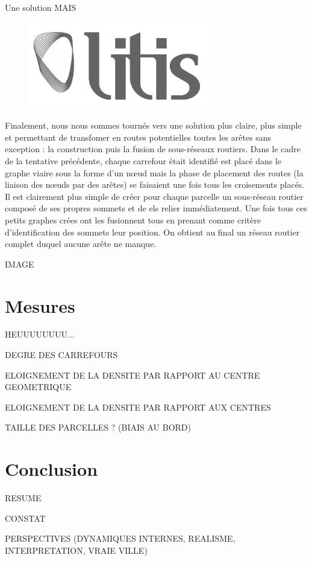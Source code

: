\documentclass[12pt]{article}
\begin{document}
Une solution MAIS

\begin{figure}
  \centering
  \includegraphics[width=.6\linewidth]{images/logo-litis.png}
  \caption{}
  \label{fig:construction-viaire3}
\end{figure}

Finalement, nous nous sommes tournés vers une solution plus claire,
plus simple et permettant de transfomer en routes potentielles toutes
les arêtes sans exception : la construction puis la fusion de
sous-réseaux routiers. Dans le cadre de la tentative précédente,
chaque carrefour était identifié est placé dans le graphe viaire sous
la forme d'un n\oe ud mais la phase de placement des routes (la
liaison des n\oe uds par des arêtes) se faisaient une fois tous les
croisements placés. Il est clairement plus simple de créer pour chaque
parcelle un sous-réseau routier composé de ses propres sommets et de
els relier immédiatement. Une fois tous ces petits graphes crées ont
les fusionnent tous en prenant comme critère d'identification des
sommets leur position. On obtient au final un réseau routier complet
duquel aucune arête ne manque.

IMAGE

\section{Mesures}

HEUUUUUUUU...

DEGRE DES CARREFOURS

ELOIGNEMENT DE LA DENSITE PAR RAPPORT AU CENTRE GEOMETRIQUE

ELOIGNEMENT DE LA DENSITE PAR RAPPORT AUX CENTRES

TAILLE DES PARCELLES ? (BIAIS AU BORD)

\section{Conclusion}

RESUME

CONSTAT

PERSPECTIVES (DYNAMIQUES INTERNES, REALISME, INTERPRETATION, VRAIE VILLE)

\printbibliography
\end{document}
